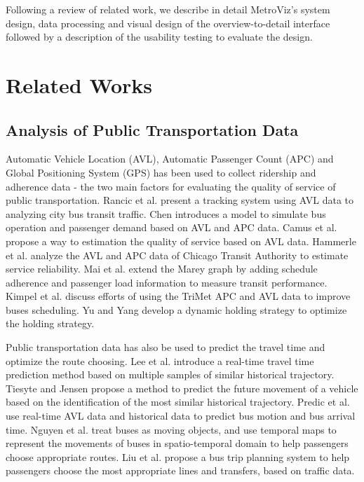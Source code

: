 \documentclass[journal]{vgtc}                %
\begin{document}
Following a review of related work, we describe in detail MetroViz's system design, data processing and visual design of the overview-to-detail interface followed by a description of the usability testing to evaluate the design.

\section{Related Works}

\subsection{Analysis of Public Transportation Data}
Automatic Vehicle Location (AVL), Automatic Passenger Count (APC) and Global Positioning System (GPS) has been used to collect ridership and adherence data - the two main factors for evaluating the quality of service of public transportation.
Rancic et al. \cite{Rancic2008} present a tracking system using AVL data to analyzing city bus transit traffic. 
Chen \cite{5203406} introduces a model to simulate bus operation and passenger demand based on AVL and APC data. 
Camus et al. \cite{camus2005estimation} propose a way to estimation the quality of service based on AVL data. 
Hammerle et al. \cite{hammerle2005use} analyze the AVL and APC data of Chicago Transit Authority to estimate service reliability.
Mai et al. \cite{mai2011visualizing} extend the Marey graph by adding schedule adherence and passenger load information to measure transit performance.
Kimpel et al. \cite{4658140} discuss efforts of using the TriMet APC and AVL data to improve buses scheduling.
Yu and Yang \cite{Yu2007} develop a dynamic holding strategy to optimize the holding strategy.

Public transportation data has also be used to predict the travel time and optimize the route choosing. 
Lee et al. \cite{Lee:2012:HNF:2424321.2424357} introduce a real-time travel time prediction method based on multiple samples of similar historical trajectory. 
Tiesyte and Jensen \cite{Tiesyte2008} propose a method to predict the future movement of a vehicle based on the identification of the most similar historical trajectory. 
Predic et al. \cite{Predic2007} use real-time AVL data and historical data to predict bus motion and bus arrival time. 
Nguyen et al. \cite{Nguyen2012} treat buses as moving objects, and use temporal maps to represent the movements of buses in spatio-temporal domain to help passengers choose appropriate routes. 
Liu et al. \cite{5958130} propose a bus trip planning system to help passengers choose the most appropriate lines and transfers, based on traffic data.
\end{document}
